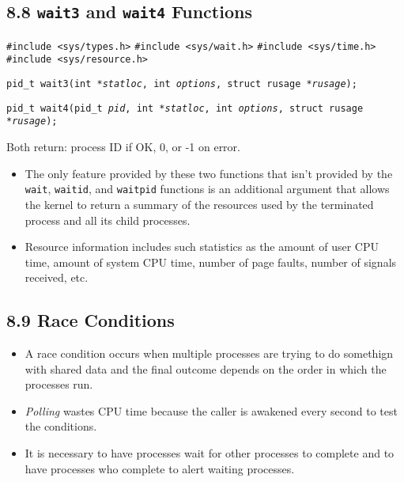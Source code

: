 \documentclass[]{article} \usepackage[all]{xy}
\newcommand{\code}{\texttt}
\begin{document}
\subsection*{8.8 \code{wait3} and \code{wait4} Functions}
\code{\#include <sys/types.h>}
\code{\#include <sys/wait.h>}
\code{\#include <sys/time.h>}
\code{\#include <sys/resource.h>}

\code{pid\_t wait3(int *\emph{statloc}, int \emph{options}, struct rusage
*\emph{rusage});}

\code{pid\_t wait4(pid\_t \emph{pid}, int *\emph{statloc}, int \emph{options},
struct rusage *\emph{rusage});}

Both return: process ID if OK, 0, or -1 on error.

\begin{itemize}
\item The only feature provided by these two functions that isn't provided by
the \code{wait}, \code{waitid}, and \code{waitpid} functions is an additional
argument that allows the kernel to return a summary of the resources used by the
terminated process and all its child processes.
\item Resource information includes such statistics as the amount of user CPU
time, amount of system CPU time, number of page faults, number of signals
received, etc.
\end{itemize}

\subsection*{8.9 Race Conditions}
\begin{itemize}
\item A race condition occurs when multiple processes are trying to do somethign
with shared data and the final outcome depends on the order in which the
processes run.
\item \emph{Polling} wastes CPU time because the caller is awakened every second
to test the conditions.
\item It is necessary to have processes wait for other processes to complete and
to have processes who complete to alert waiting processes.
\end{itemize}
\end{document}
